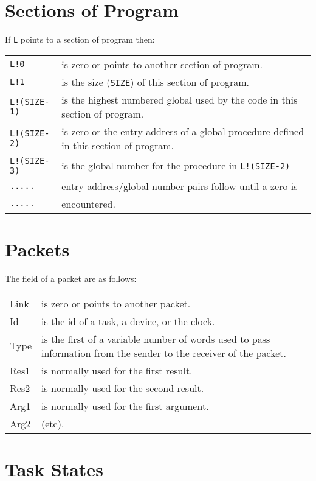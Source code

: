 \section{Sections of Program}

     If \verb|L| points to a section of program then:

\begin{tabular}{lp{8.5cm}}
     \verb|L!0|&is zero or points to another section of program.\\
     \verb|L!1|&is the size (\verb|SIZE|) of this section of
     program.\\
     \verb|L!(SIZE-1)|&is the highest numbered global used
     by the code in this section of program.\\
     \verb|L!(SIZE-2)|&is
     zero or the entry address of a global procedure defined in this
     section of program.\\
      \verb|L!(SIZE-3)|&is the global number for
     the procedure in \verb|L!(SIZE-2)|\\
     \verb|.....|&entry address/global
     number pairs follow until a zero is \\
     \verb|.....|&encountered.\\
\end{tabular}

\section{Packets}

     The field of a packet are as follows:

\begin{tabular}{lp{8.5cm}}
     Link&is zero or points to another packet.\\
     Id&is the id of a task, a device, or the clock.\\
     Type&is the first of a variable number of words used to pass 
                 information from the sender to the receiver of the packet.\\
     Res1&is normally used for the first result.\\
     Res2&is normally used for the second result.\\
     Arg1&is normally used for the first argument.\\
     Arg2&(etc).\\
\end{tabular}

\section{Task States}

